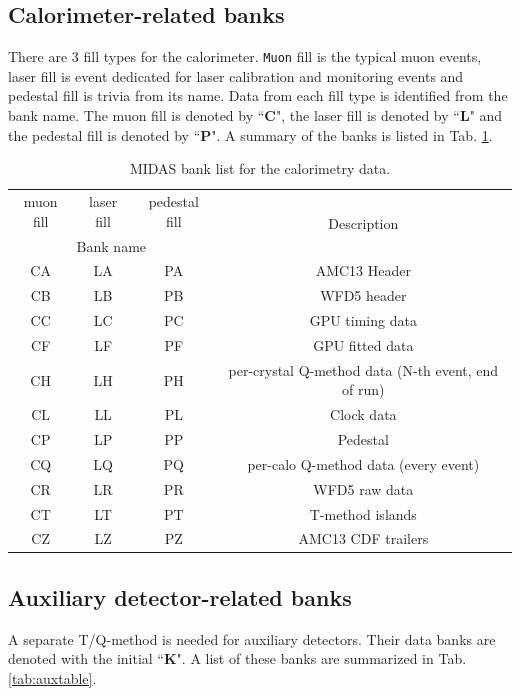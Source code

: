 \subsection{Calorimeter-related banks}

There are 3 fill types for the calorimeter. \verb+Muon+ fill is the typical muon events, laser fill is event dedicated for laser calibration and monitoring events and pedestal fill is trivia from its name. Data from each fill type is identified from the bank name. The muon fill is denoted by ``\textbf{C}", the laser fill is denoted by ``\textbf{L}" and the pedestal fill is denoted by ``\textbf{P}". A summary of the banks is listed in Tab. \ref{tab:calotable}.

\begin{table}[htbp]
\centering
\caption{MIDAS bank list for the calorimetry data.}
\begin{tabular}{|c|c|c|c|}
\hline 
muon fill& laser fill & pedestal fill  & \multirow{2}{*}{Description} \\ \cline{1-3}
\multicolumn{3}{|c|}{Bank name} & \\
\hline
CA & LA & PA & AMC13 Header \\ 
\hline 
CB & LB & PB & WFD5 header \\ 
\hline 
CC & LC & PC & GPU timing data \\ 
\hline 
CF & LF & PF & GPU fitted data \\ 
\hline 
CH & LH & PH & per-crystal Q-method data (N-th event, end of run) \\ 
\hline 
CL & LL & PL & Clock data \\ 
\hline 
CP & LP & PP & Pedestal\\ 
\hline 
CQ & LQ & PQ & per-calo Q-method data (every event) \\ 
\hline 
CR & LR & PR & WFD5 raw data \\ 
\hline 
CT & LT & PT & T-method islands \\ 
\hline 
CZ & LZ & PZ & AMC13 CDF trailers \\ 
\hline 
\end{tabular} 
\label{tab:calotable}
\end{table}

\subsection{Auxiliary detector-related banks}

A separate T/Q-method is needed for auxiliary detectors. Their data banks are denoted with the initial ``\textbf{K}".
A list of these banks are summarized in Tab. \ref{tab:auxtable}.


